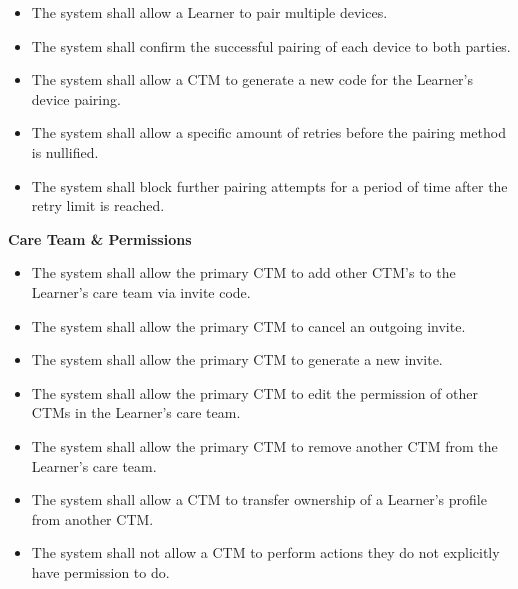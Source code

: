 \documentclass[12pt]{article}
\newcounter{reqnumD} %
\newcounter{reqnumC} %
\begin{document}
\noindent \begin{itemize}
  \setcounter{reqnumD}{0}

  \item[\refstepcounter{reqnumD}\thereqnumD \label{FR-DEV-1}:] The system shall allow a Learner to pair multiple devices.

  \item[\refstepcounter{reqnumD}\thereqnumD \label{FR-DEV-2}:] The system shall confirm the successful pairing of each device to both parties.

  \item[\refstepcounter{reqnumD}\thereqnumD \label{FR-DEV-3}:] The system shall allow a CTM to generate a new code for the Learner's device pairing.

  \item[\refstepcounter{reqnumD}\thereqnumD \label{FR-DEV-4}:] The system shall allow a specific amount of retries before the pairing method is nullified.

  \item[\refstepcounter{reqnumD}\thereqnumD \label{FR-DEV-5}:] The system shall block further pairing attempts for a period of time after the retry limit is reached.

\end{itemize}

\noindent \textbf{Care Team \& Permissions}

\noindent \begin{itemize}
  \setcounter{reqnumC}{0}

  \item[\refstepcounter{reqnumC}\thereqnumC \label{FR-TEAM-1}:] The system shall allow the primary CTM to add other CTM's to the Learner's care team via invite code.

  \item[\refstepcounter{reqnumC}\thereqnumC \label{FR-TEAM-2}:] The system shall allow the primary CTM to cancel an outgoing invite.

  \item[\refstepcounter{reqnumC}\thereqnumC \label{FR-TEAM-3}:] The system shall allow the primary CTM to generate a new invite.

  \item[\refstepcounter{reqnumC}\thereqnumC \label{FR-TEAM-4}:] The system shall allow the primary CTM to edit the permission of other CTMs in the Learner's care team.

  \item[\refstepcounter{reqnumC}\thereqnumC \label{FR-TEAM-5}:] The system shall allow the primary CTM to remove another CTM from the Learner's care team.

  \item[\refstepcounter{reqnumC}\thereqnumC \label{FR-TEAM-6}:] The system shall allow a CTM to transfer ownership of a Learner's profile from another CTM.

  \item[\refstepcounter{reqnumC}\thereqnumC \label{FR-TEAM-7}:] The system shall not allow a CTM to perform actions they do not explicitly have permission to do.
\end{itemize}
\end{document}
